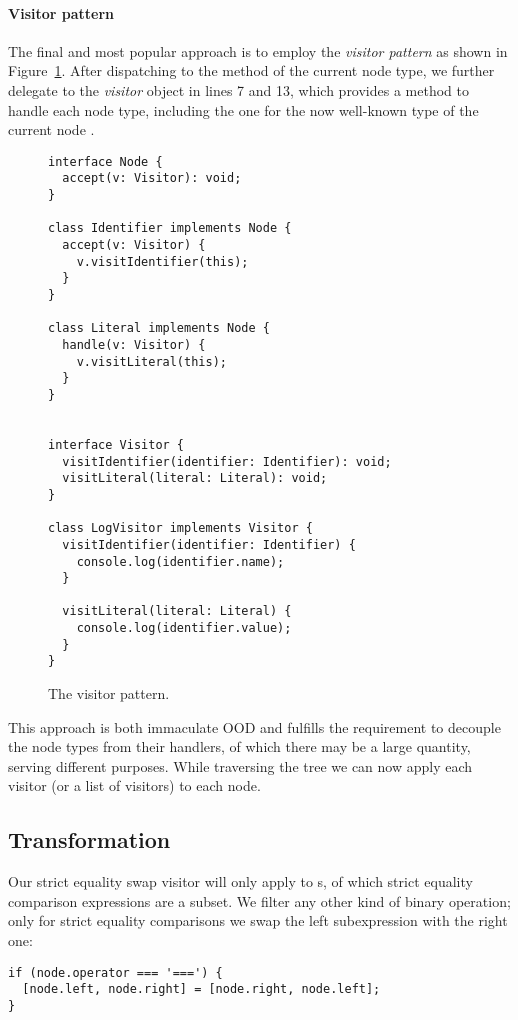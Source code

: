 \paragraph{Visitor pattern}
The final and most popular approach is
to employ the \textit{visitor pattern}
as shown in Figure~\ref{fig:TreeNodeVisitorPattern}.
\autocite{DesignPatterns}
After dispatching to the  method
of the current node type,
we further delegate to the \textit{visitor} object
in lines 7 and 13,
which provides a method to handle each node type,
including the one for the now well-known type
of the current node .

\begin{figure}
  \begin{verbatim}
interface Node {
  accept(v: Visitor): void;
}

class Identifier implements Node {
  accept(v: Visitor) {
    v.visitIdentifier(this);
  }
}

class Literal implements Node {
  handle(v: Visitor) {
    v.visitLiteral(this);
  }
}


interface Visitor {
  visitIdentifier(identifier: Identifier): void;
  visitLiteral(literal: Literal): void;
}

class LogVisitor implements Visitor {
  visitIdentifier(identifier: Identifier) {
    console.log(identifier.name);
  }

  visitLiteral(literal: Literal) {
    console.log(identifier.value);
  }
}
  \end{verbatim}
  \caption{
    The visitor pattern.
  }\label{fig:TreeNodeVisitorPattern}
\end{figure}

This approach is both immaculate OOD and
fulfills the requirement to
decouple the node types from their handlers,
of which there may be a large quantity,
serving different purposes.
While traversing the tree we can now apply each visitor
(or a list of visitors) to each node.

\subsection{Transformation}
Our strict equality swap visitor will only apply to s,
of which strict equality comparison expressions are a subset.
We filter any other kind of binary operation;
only for strict equality comparisons we swap the
left subexpression with the right one:
\begin{verbatim}
if (node.operator === '===') {
  [node.left, node.right] = [node.right, node.left];
}
\end{verbatim}

